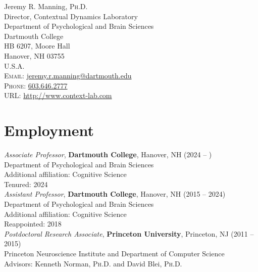 \documentclass[11pt, a4paper]{article} %
\begin{document}

{\LARGE Jeremy R. Manning, \textsc{Ph.D.}}\\ %
Director, Contextual Dynamics Laboratory\\[0.25cm]
Department of Psychological and Brain Sciences\\
Dartmouth College\\ %
\textsc{HB} 6207, Moore Hall\\
Hanover, \textsc{NH}  03755\\
\textsc{U.S.A.}\\[.2cm]
\textsc{Email}: \href{mailto:jeremy.r.manning@dartmouth.edu}{jeremy.r.manning@dartmouth.edu}\\
\textsc{Phone}: \href{tel:6036462777}{603.646.2777}\\ %
\textsc{URL}:
\href{http://www.context-lab.com}{http://www.context-lab.com}\\ %

\section*{Employment}
\emph{Associate Professor},
\textbf{Dartmouth College}, Hanover, NH (2024 -- )\\
Department of Psychological and Brain Sciences \\
Additional affiliation: Cognitive Science\\
Tenured: 2024\\[.1cm]

\emph{Assistant Professor},
\textbf{Dartmouth College}, Hanover, NH (2015 -- 2024)\\
Department of Psychological and Brain Sciences \\
Additional affiliation: Cognitive Science\\
Reappointed: 2018\\[.1cm]

\emph{Postdoctoral Research
  Associate}, \textbf{Princeton University}, Princeton, NJ (2011 -- 2015)\\
Princeton Neuroscience
Institute and Department of Computer Science\\
Advisors: Kenneth Norman, \textsc{Ph.D.} and David Blei, \textsc{Ph.D.}
\end{document}
